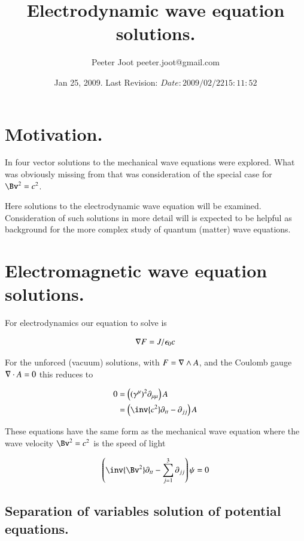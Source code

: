 \documentclass{article}
\title{ Electrodynamic wave equation solutions. }
\author{Peeter Joot \quad peeter.joot@gmail.com}
\date{ Jan 25, 2009.  Last Revision: $Date: 2009/02/22 15:11:52 $ }
\begin{document}
\maketitle{}
\tableofcontents

\section{ Motivation. }

In \cite{PJwaveFourVector} four vector solutions to the mechanical wave
equations were explored.  What was obviously missing from that 
was consideration of the special case for $\Bv^2 = c^2$.

Here solutions to the electrodynamic wave equation will be examined.
Consideration of such solutions in more detail will is expected
to be helpful 
as background for the more complex study of quantum (matter) wave equations.

\section{ Electromagnetic wave equation solutions. }

For electrodynamics our equation to solve is

\begin{align}
\nabla F = J/\epsilon_0 c
\end{align}

For the unforced (vacuum) solutions, with 
$F = \nabla \wedge A$, and the Coulomb gauge $\nabla \cdot A = 0$ this 
reduces to

\begin{align*}
0 
&= \left((\gamma^\mu)^2 \partial_{\mu\mu}\right) A  \\
&= \left( \inv{c^2}\partial_{tt} -\partial_{jj} \right) A
\end{align*}

These equations have the same form as the mechanical wave equation
where the wave velocity $\Bv^2 = c^2$ is the speed of light

\begin{align}\label{eqn:waveEquation}
\left( \inv{\Bv^2} \partial_{tt} - \sum_{j=1}^3 \partial_{jj}\right) \psi = 0
\end{align}

\subsection{ Separation of variables solution of potential equations. }
\end{document}
